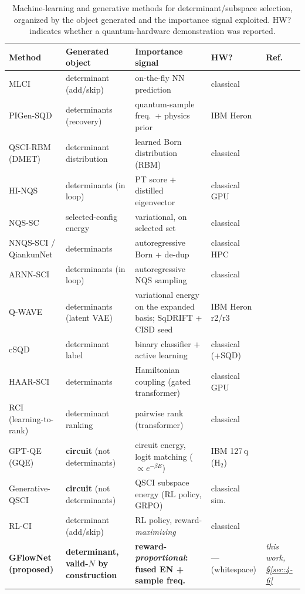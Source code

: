 \documentclass[onecolumn,a4paper]{quantumarticle}
\begin{document}
\begin{table}[t]\centering\footnotesize
\caption{Machine-learning and generative methods for determinant/subspace selection, organized by the object generated and the importance signal exploited. HW? indicates whether a quantum-hardware demonstration was reported.}
\label{tab:ml}
\renewcommand{\arraystretch}{1.25}
\begin{tabularx}{\textwidth}{@{}>{\raggedright\arraybackslash}p{2.0cm} >{\raggedright\arraybackslash}p{2.5cm} >{\raggedright\arraybackslash}X >{\raggedright\arraybackslash}p{1.55cm} >{\raggedright\arraybackslash}p{2.5cm}@{}}
\toprule
\textbf{Method} & \textbf{Generated object} & \textbf{Importance signal} & \textbf{HW?} & \textbf{Ref.} \\
\midrule
MLCI & determinant (add/skip) & on-the-fly NN prediction & classical & \cite{coe2018} \\
PIGen-SQD & determinants (recovery) & quantum-sample freq.\ + physics prior & IBM Heron & \cite{patra2025} \\
QSCI-RBM (DMET) & determinant distribution & learned Born distribution (RBM) & classical & \cite{patra2026} \\
HI-NQS & determinants (in loop) & PT score + distilled eigenvector & classical GPU & \cite{chang2026} \\
NQS-SC & selected-config energy & variational, on selected set & classical & \cite{solanki2026} \\
NNQS-SCI / QiankunNet & determinants & autoregressive Born + de-dup & classical HPC & \cite{shang2025,sun2026} \\
ARNN-SCI & determinants (in loop) & autoregressive NQS sampling & classical & \cite{thompson2026} \\
Q-WAVE & determinants (latent VAE) & variational energy on the expanded basis; SqDRIFT + CISD seed & IBM Heron r2/r3 & \cite{qwave2026} \\
cSQD & determinant label & binary classifier + active learning & classical (+SQD) & \cite{zeni2026} \\
HAAR-SCI & determinants & Hamiltonian coupling (gated transformer) & classical GPU & \cite{zhanghaar2025} \\
RCI (learning-to-rank) & determinant ranking & pairwise rank (transformer) & classical & \cite{nie2026} \\
GPT-QE (GQE) & \textbf{circuit} (not determinants) & circuit energy, logit matching ($\propto e^{-\beta E}$) & IBM 127\,q (H$_2$) & \cite{nakaji2024} \\
Generative-QSCI & \textbf{circuit} (not determinants) & QSCI subspace energy (RL policy, GRPO) & classical sim.\ & \cite{kemmoku2026} \\
RL-CI & determinant (add/skip) & RL policy, reward-\emph{maximizing} & classical & \cite{goings2021} \\
\textbf{GFlowNet (proposed)} & \textbf{determinant, valid-$N$ by construction} & \textbf{reward-\emph{proportional}: fused EN + sample freq.} & --- (whitespace) & \emph{this work, \S\ref{sec:4-6}} \\
\bottomrule
\end{tabularx}
\end{table}
\end{document}
